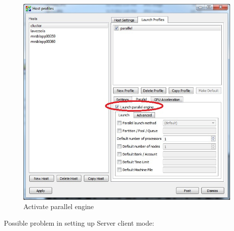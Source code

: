 \documentclass[12pt]{report}
\begin{document}
        \begin{figure}
        \begin{center}
        \includegraphics{setHostProfileParallel2}
        \caption{Activate parallel engine}
        \label{figure:setHostProfileParallel2}
        \end{center}
        \end{figure}


   Possible problem in setting up Server client mode:
\end{document}
